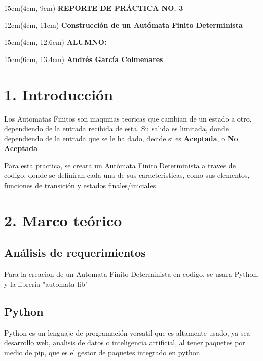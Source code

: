 \documentclass{article}
\begin{document}
\BgThispage
\-
\begin{textblock*}{15cm}(4cm, 9cm)
    {\fontsize{30pt}{16pt}\selectfont
    \textcolor{rojo}{\textbf{REPORTE DE PRÁCTICA NO. 3}}
    }
\end{textblock*}
\begin{textblock*}{12cm}(4cm, 11cm)
    {\fontsize{20pt}{16pt}\selectfont
    \textcolor{rojo}{\textbf{Construcción de un Autómata 
    Finito Determinista}}
    }
    
\end{textblock*}
\begin{textblock*}{15cm}(4cm, 12.6cm)
    {\fontsize{13pt}{16pt}\selectfont
    \textcolor{rojo}{\textbf{ALUMNO:}}
    }
\end{textblock*}
\begin{textblock*}{15cm}(6cm, 13.4cm)
    {\fontsize{11pt}{16pt}\selectfont
    \textcolor{rojo}{\textbf{Andrés García Colmenares}}
    }
\end{textblock*}

\newpage

\section{1. Introducción}
    \large Los Automatas Finitos son maquinas teoricas que cambian de un estado a otro, dependiendo de la entrada recibida de esta. Su salida es limitada, donde dependiendo de la entrada que se le ha dado, decide si es \textbf{Aceptada}, o \textbf{No Aceptada}

    \large Para esta practica, se creara un Autómata Finito Determinista a traves de codigo, donde se definiran cada una de sus caracteristicas, como sus elementos, funciones de transición y estados finales/iniciales

\section{2. Marco teórico}
    \subsection{Análisis de requerimientos}
    Para la creacion de un Automata Finito Determinista en codigo, se usara Python, y la libreria "automata-lib"
    
    \subsection{Python}
    Python es un lenguaje de programación versatil que es altamente usado, ya sea desarrollo web, analisis de datos o inteligencia artificial, al tener paquetes por medio de pip, que es el gestor de paquetes integrado en python \cite{b5}
    
\end{document}
